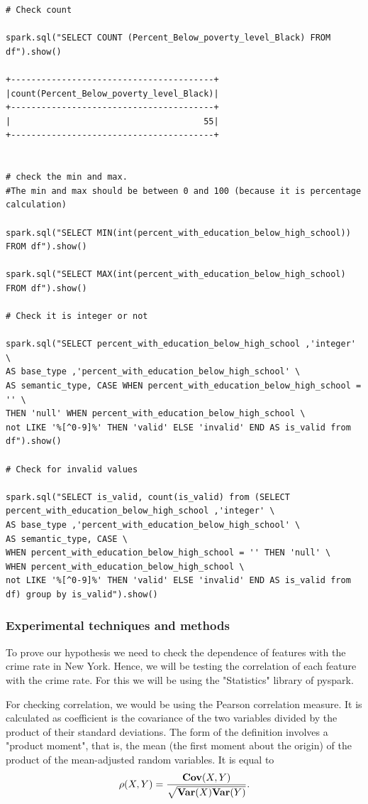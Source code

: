 \documentclass{article}
\begin{document}
\begin{verbatim}
# Check count

spark.sql("SELECT COUNT (Percent_Below_poverty_level_Black) FROM df").show()

+----------------------------------------+
|count(Percent_Below_poverty_level_Black)|
+----------------------------------------+
|                                      55|
+----------------------------------------+


# check the min and max. 
#The min and max should be between 0 and 100 (because it is percentage calculation)

spark.sql("SELECT MIN(int(percent_with_education_below_high_school)) FROM df").show()

spark.sql("SELECT MAX(int(percent_with_education_below_high_school) FROM df").show()

# Check it is integer or not

spark.sql("SELECT percent_with_education_below_high_school ,'integer' \  
AS base_type ,'percent_with_education_below_high_school' \  
AS semantic_type, CASE WHEN percent_with_education_below_high_school = '' \ 
THEN 'null' WHEN percent_with_education_below_high_school \  
not LIKE '%[^0-9]%' THEN 'valid' ELSE 'invalid' END AS is_valid from df").show()

# Check for invalid values

spark.sql("SELECT is_valid, count(is_valid) from (SELECT percent_with_education_below_high_school ,'integer' \  
AS base_type ,'percent_with_education_below_high_school' \  
AS semantic_type, CASE \  
WHEN percent_with_education_below_high_school = '' THEN 'null' \  
WHEN percent_with_education_below_high_school \  
not LIKE '%[^0-9]%' THEN 'valid' ELSE 'invalid' END AS is_valid from df) group by is_valid").show()
\end{verbatim}

\subsubsection{Experimental techniques and methods}

To prove our hypothesis we need to check the dependence of features with the crime rate in New York. Hence, we will be testing the correlation of each feature with the crime rate. For this we will be using the "Statistics" library of pyspark. 

For checking correlation, we would be using the Pearson correlation measure. It is calculated as coefficient is the covariance of the two variables divided by the product of their standard deviations. The form of the definition involves a "product moment", that is, the mean (the first moment about the origin) of the product of the mean-adjusted random variables. It is equal to $$\rho(X,Y) = \frac{{\bf
Cov}(X,Y)}{\sqrt{{\bf Var}(X){\bf Var}(Y)}}.$$
\end{document}
